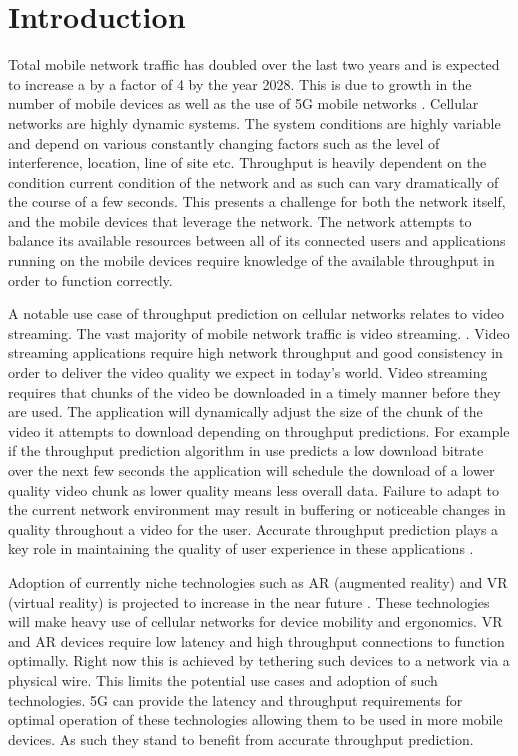 \chapter{Introduction}
Total mobile network traffic has doubled over the last two years and is expected to increase a by a factor of 4 by the year 2028. This is due to growth in the number of mobile devices as well as the use of 5G mobile networks \cite{Eri22}. Cellular networks are highly dynamic systems. The system conditions are highly variable and depend on various constantly changing factors such as the level of interference, location, line of site etc. Throughput is heavily dependent on the condition current condition of the network and as such can vary dramatically of the course of a few seconds. This presents a challenge for both the network itself, and the mobile devices that leverage the network. The network attempts to balance its available resources between all of its connected users and applications running on the mobile devices require knowledge of the available throughput in order to function correctly. 

A notable use case of throughput prediction on cellular networks relates to video streaming. The vast majority of mobile network traffic is video streaming. \cite{Eri22}. Video streaming applications require high network throughput and good consistency in order to deliver the video quality we expect in today's world. Video streaming requires that chunks of the video be downloaded in a timely manner before they are used. The application will dynamically adjust the size of the chunk of the video it attempts to download depending on throughput predictions. For example if the throughput prediction algorithm in use predicts a low download bitrate over the next few seconds the application will schedule the download of a lower quality video chunk as lower quality means less overall data. Failure to adapt to the current network environment may result in buffering or noticeable changes in quality throughout a video for the user. Accurate throughput prediction plays a key role in maintaining the quality of user experience in these applications \cite{raca2019improving}. 

Adoption of currently niche technologies such as AR (augmented reality) and VR (virtual reality) is projected to increase in the near future \cite{Sta22}. These technologies will make heavy use of cellular networks for device mobility and ergonomics. VR and AR devices require low latency and high throughput connections to function optimally. Right now this is achieved by tethering such devices to a network via a physical wire. This limits the potential use cases and adoption of such technologies. 5G can provide the latency and throughput requirements for optimal operation of these technologies allowing them to be used in more mobile devices. As such they stand to benefit from accurate throughput prediction.

